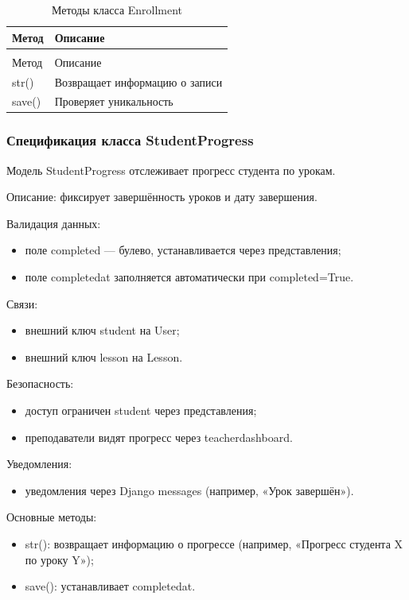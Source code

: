 \begin{xltabular}{\textwidth}{|l|X|}
	\caption{Методы класса Enrollment\label{tab:enrollment_methods}}\\
	\hline
	Метод & Описание \\ \hline
	\endfirsthead
	\\
	\hline
	Метод & Описание \\ \hline
	\endhead
	str() & Возвращает информацию о записи \\ \hline
	save() & Проверяет уникальность \\ \hline
\end{xltabular}

\subsubsection{Спецификация класса StudentProgress}

Модель StudentProgress отслеживает прогресс студента по урокам.


Описание: фиксирует завершённость уроков и дату завершения.

Валидация данных:
	\begin{itemize}
		\item поле completed — булево, устанавливается через представления;
		\item поле completedat заполняется автоматически при completed=True.
	\end{itemize}
	
Связи:
	\begin{itemize}
		\item внешний ключ student на User;
		\item внешний ключ lesson на Lesson.
	\end{itemize}
	
Безопасность:
	\begin{itemize}
		\item доступ ограничен student через представления;
		\item преподаватели видят прогресс через teacherdashboard.
	\end{itemize}
	
Уведомления:
	\begin{itemize}
		\item уведомления через Django messages (например, «Урок завершён»).
	\end{itemize}
	
Основные методы:
	\begin{itemize}
		\item str(): возвращает информацию о прогрессе (например, «Прогресс студента X по уроку Y»);
		\item save(): устанавливает completedat.
	\end{itemize}
	
